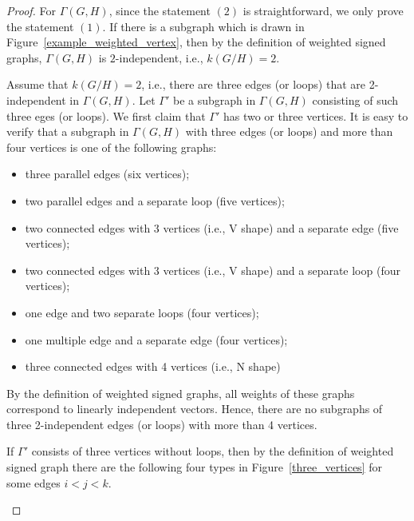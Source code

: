 \documentclass[10pt,a4paper]{amsart}
\newtheorem{scope}{Scope}
\begin{document}
\begin{proof}
For $\Gamma(G,H)$, since the statement $(2)$ is straightforward, we only prove the statement $(1)$.
If there is a subgraph which is drawn in Figure~\ref{example_weighted_vertex}, then by the definition of weighted signed graphs, $\Gamma(G,H)$ is $2$-independent, i.e., $k(G/H)=2$. 
 
Assume that $k(G/H)=2$, i.e., there are three edges (or loops) that are 2-independent in $\Gamma(G,H)$.
Let $\Gamma'$ be a subgraph in $\Gamma(G,H)$ consisting of such three eges (or loops). 
We first claim that $\Gamma'$ has two or three vertices.
It is easy to verify that a subgraph in $\Gamma(G,H)$ with three edges (or loops) and more than four vertices is one of the following graphs: 
\begin{itemize}
\item three parallel edges (six vertices);
\item two parallel edges and a separate loop (five vertices);
\item two connected edges with 3 vertices (i.e., V shape) and a separate edge (five vertices);
\item two connected edges with 3 vertices (i.e., V shape) and a separate loop (four vertices);
\item one edge and two separate loops (four vertices);
\item one multiple edge and a separate edge (four vertices);
\item three connected edges with 4 vertices (i.e., N shape)
\end{itemize}
By the definition of weighted signed graphs, all weights of these graphs correspond to linearly independent vectors. 
Hence, there are no subgraphs of three 2-independent edges (or loops) with more than 4 vertices.

If $\Gamma'$ consists of three vertices without loops, then by the definition of weighted signed graph there are the following four types in Figure~\ref{three_vertices} for some edges $i<j<k$.
\begin{figure}[H]
\end{figure}
\end{proof}
\end{document}
